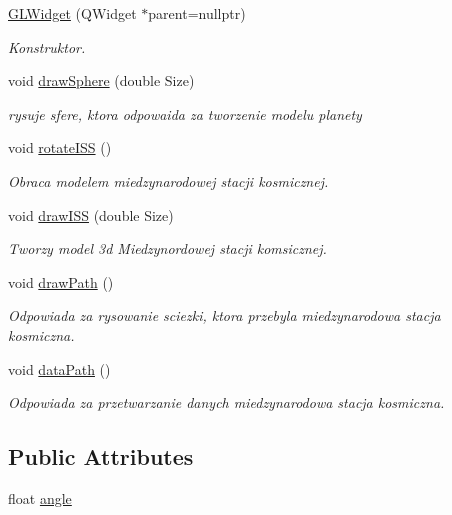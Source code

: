 \begin{DoxyCompactItemize}
\item 
\hyperlink{class_g_l_widget_a6d18f16f104a0a7a5e560c440e56694b}{G\+L\+Widget} (Q\+Widget $\ast$parent=nullptr)
\begin{DoxyCompactList}\small\item\em Konstruktor. \end{DoxyCompactList}\item 
void \hyperlink{class_g_l_widget_a5088e389af053b34a5562848ca657b60}{draw\+Sphere} (double Size)
\begin{DoxyCompactList}\small\item\em rysuje sfere, ktora odpowaida za tworzenie modelu planety \end{DoxyCompactList}\item 
void \hyperlink{class_g_l_widget_a5470f4ec06def75b98a2d98741319c5a}{rotate\+I\+SS} ()
\begin{DoxyCompactList}\small\item\em Obraca modelem miedzynarodowej stacji kosmicznej. \end{DoxyCompactList}\item 
void \hyperlink{class_g_l_widget_a26a5804fe4acf2830429244ced110852}{draw\+I\+SS} (double Size)
\begin{DoxyCompactList}\small\item\em Tworzy model 3d Miedzynordowej stacji komsicznej. \end{DoxyCompactList}\item 
void \hyperlink{class_g_l_widget_ac620b32de6bc4f0dc4b3a8961d774234}{draw\+Path} ()
\begin{DoxyCompactList}\small\item\em Odpowiada za rysowanie sciezki, ktora przebyla miedzynarodowa stacja kosmiczna. \end{DoxyCompactList}\item 
void \hyperlink{class_g_l_widget_a1c39f1139befc7b29bfcaf2f2518ca45}{data\+Path} ()
\begin{DoxyCompactList}\small\item\em Odpowiada za przetwarzanie danych miedzynarodowa stacja kosmiczna. \end{DoxyCompactList}\end{DoxyCompactItemize}
\subsection*{Public Attributes}
\begin{DoxyCompactItemize}
\item 
float \hyperlink{class_g_l_widget_accdb0c12ee2b5afb62f23d69e19adbf5}{angle}
\end{DoxyCompactItemize}
